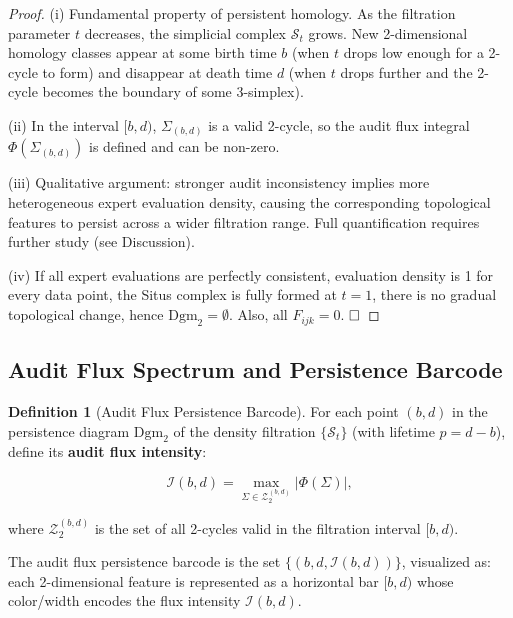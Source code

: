 \documentclass[12pt,a4paper]{article}
\theoremstyle{plain}
\theoremstyle{definition}
\newtheorem{definition}[theorem]{Definition}
\theoremstyle{remark}
\newcommand{\SSS}{\mathcal{S}}
\begin{document}
\begin{proof}
(i) Fundamental property of persistent homology. As the filtration parameter $t$ decreases, the simplicial complex $\SSS_t$ grows. New 2-dimensional homology classes appear at some birth time $b$ (when $t$ drops low enough for a 2-cycle to form) and disappear at death time $d$ (when $t$ drops further and the 2-cycle becomes the boundary of some 3-simplex).

(ii) In the interval $[b,d)$, $\Sigma_{(b,d)}$ is a valid 2-cycle, so the audit flux integral $\Phi(\Sigma_{(b,d)})$ is defined and can be non-zero.

(iii) Qualitative argument: stronger audit inconsistency implies more heterogeneous expert evaluation density, causing the corresponding topological features to persist across a wider filtration range. Full quantification requires further study (see Discussion).

(iv) If all expert evaluations are perfectly consistent, evaluation density is 1 for every data point, the Situs complex is fully formed at $t=1$, there is no gradual topological change, hence $\mathrm{Dgm}_2 = \emptyset$. Also, all $F_{ijk} = 0$. $\hfill\square$
\end{proof}

\subsection{Audit Flux Spectrum and Persistence Barcode}
\label{sec:barcode}

\begin{definition}[Audit Flux Persistence Barcode]
\label{def:flux_barcode}
For each point $(b,d)$ in the persistence diagram $\mathrm{Dgm}_2$ of the density filtration $\{\SSS_t\}$ (with lifetime $p = d-b$), define its \textbf{audit flux intensity}:

\begin{equation}\label{eq:flux_intensity}
    \mathcal{I}(b,d) = \max_{\Sigma \in \mathcal{Z}_2^{(b,d)}} |\Phi(\Sigma)|,
\end{equation}

where $\mathcal{Z}_2^{(b,d)}$ is the set of all 2-cycles valid in the filtration interval $[b,d)$.

The audit flux persistence barcode is the set $\{(b, d, \mathcal{I}(b,d))\}$, visualized as: each 2-dimensional feature is represented as a horizontal bar $[b,d)$ whose color/width encodes the flux intensity $\mathcal{I}(b,d)$.
\end{definition}
\end{document}
